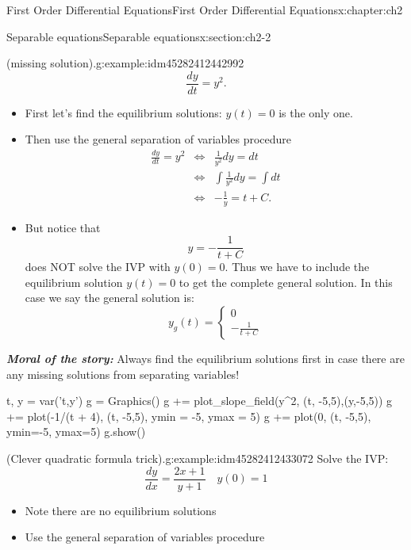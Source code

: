 \documentclass[oneside,10pt,]{book}
\newcommand{\alert}[1]{\textbf{\textit{#1}}}
\numberwithin{equation}{section}
\numberwithin{equation}{section}
\newcommand{\amp}{&}
\begin{document}
\begin{chapterptx}{First Order Differential Equations}{}{First Order Differential Equations}{}{}{x:chapter:ch2}
\begin{sectionptx}{Separable equations}{}{Separable equations}{}{}{x:section:ch2-2}
\begin{example}{(missing solution).}{g:example:idm45282412442992}
\begin{equation*}
\frac{dy}{dt}=y^{2}.
\end{equation*}
%
%
\begin{itemize}[label=\textbullet]
\item{}First let's find the equilibrium solutions: \(y(t)=0\) is the only one.%
\item{}Then use the general separation of variables procedure%
\begin{align*}
\frac{dy}{dt}=y^{2} \amp \iff \amp \frac{1}{y^{2}}dy=dt\\
\amp \iff \amp \int\frac{1}{y^{2}}dy=\int dt\\
\amp \iff \amp -\frac{1}{y}=t+C.
\end{align*}
%
\item{}But notice that%
\begin{equation*}
y=-\frac{1}{t+C}
\end{equation*}
does NOT solve the IVP with \(y(0)=0\). Thus we have to include the equilibrium solution \(y(t)=0\) to get the complete general solution. In this case we say the general solution is:%
\begin{equation*}
y_g(t) = \begin{cases}
0\\
-\frac{1}{t + C}
\end{cases}
\end{equation*}
%
\end{itemize}
\alert{Moral of the story:} Always find the equilibrium solutions first in case there are any missing solutions from separating variables!%
\begin{sageinput}
t, y = var('t,y')
g = Graphics()
g += plot_slope_field(y^2, (t, -5,5),(y,-5,5))
g += plot(-1/(t + 4), (t, -5,5), ymin = -5, ymax = 5)
g += plot(0, (t, -5,5), ymin=-5, ymax=5)
g.show()
\end{sageinput}
\end{example}
\begin{example}{(Clever quadratic formula trick).}{g:example:idm45282412433072}%
Solve the IVP:%
\begin{equation*}
\frac{dy}{dx}=\frac{2x+1}{y+1}\,\,\,\,\,\,y(0)=1
\end{equation*}
%
%
\begin{itemize}[label=\textbullet]
\item{}Note there are no equilibrium solutions%
\item{}Use the general separation of variables procedure%
\begin{align*}

\end{align*}
\end{itemize}
\end{example}
\end{sectionptx}
\end{chapterptx}
\end{document}
